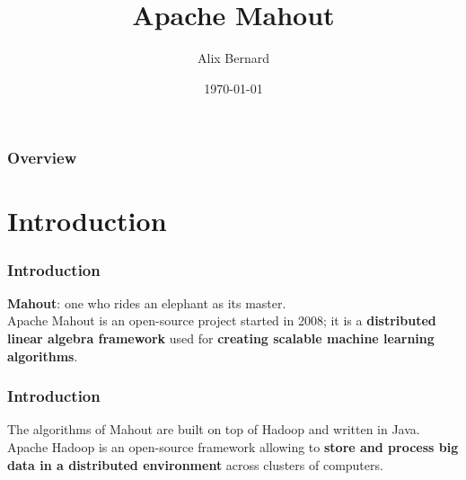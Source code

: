 \documentclass{beamer}
\title{Apache Mahout} %
\author{
Alix Bernard
} %
\institute %
\date{\today} %
\begin{document}
\begin{frame}
\titlepage %
\end{frame}

\begin{frame}
\frametitle{Overview} %
\tableofcontents %
\end{frame}


\section{Introduction} %


\begin{frame}
\frametitle{Introduction}
\textbf{Mahout}: one who rides an elephant as its master.\\
\vspace{1cm}
Apache Mahout is an open-source project started in 2008; it is a \textbf{distributed linear algebra framework} used for \textbf{creating scalable machine learning algorithms}.
\end{frame}

\begin{frame}
\frametitle{Introduction}
The algorithms of Mahout are built on top of Hadoop and written in Java.\\
\vspace{1cm}
Apache Hadoop is an open-source framework allowing to \textbf{store and process big data in a distributed environment} across clusters of computers.
\end{frame}
\end{document}
